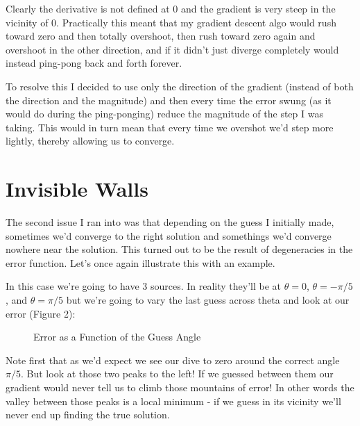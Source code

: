 \documentclass[12pt,a6paper]{book}
\begin{document}
Clearly the derivative is not defined at 0 and the gradient is very steep in the vicinity of 0. Practically this meant that my gradient descent algo would rush toward zero and then totally overshoot, then rush toward zero again and overshoot in the other direction, and if it didn't just diverge completely would instead ping-pong back and forth forever. 

To resolve this I decided to use only the direction of the gradient (instead of both the direction and the magnitude) and then every time the error swung (as it would do during the ping-ponging) reduce the magnitude of the step I was taking. This would in turn mean that every time we overshot we'd step more lightly, thereby allowing us to converge. 

\section{Invisible Walls}
The second issue I ran into was that depending on the guess I initially made, sometimes we'd converge to the right solution and somethings we'd converge nowhere near the solution. This turned out to be the result of degeneracies in the error function. Let's once again illustrate this with an example.

In this case we're going to have 3 sources. In reality they'll be at $\theta=0$, $\theta=-\pi/5$, and $\theta=\pi/5$ but we're going to vary the last guess across theta and look at our error (Figure 2):

\begin{figure}[!htb]
\caption{\label{fig:my-label} Error as a Function of the Guess Angle}
\end{figure}

Note first that as we'd expect we see our dive to zero around the correct angle $\pi/5$. But look at those two peaks to the left! If we guessed between them our gradient would never tell us to climb those mountains of error! In other words the valley between those peaks is a local minimum - if we guess in its vicinity we'll never end up finding the true solution. 
\end{document}
